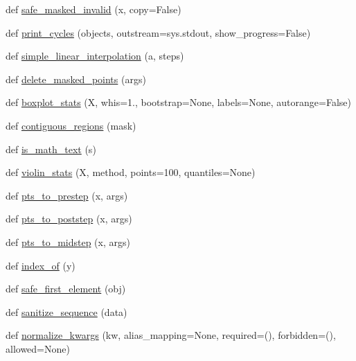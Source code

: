 \begin{DoxyCompactItemize}
\item 
def \hyperlink{namespacematplotlib_1_1cbook_a1b513669a33f2fff0c61d719ea76f0a1}{safe\+\_\+masked\+\_\+invalid} (x, copy=False)
\item 
def \hyperlink{namespacematplotlib_1_1cbook_ad14ca04fafb21b27932fe178ee5d32b6}{print\+\_\+cycles} (objects, outstream=sys.\+stdout, show\+\_\+progress=False)
\item 
def \hyperlink{namespacematplotlib_1_1cbook_a10de3acab7db43705a4a1a2ce7b12098}{simple\+\_\+linear\+\_\+interpolation} (a, steps)
\item 
def \hyperlink{namespacematplotlib_1_1cbook_aaef0de8c17f94f25ceba253a5abbc33e}{delete\+\_\+masked\+\_\+points} (args)
\item 
def \hyperlink{namespacematplotlib_1_1cbook_a09feb80736ebe2521845f87e1941bc14}{boxplot\+\_\+stats} (X, whis=1., bootstrap=None, labels=None, autorange=False)
\item 
def \hyperlink{namespacematplotlib_1_1cbook_aee5e1f5850d10d2ac4ce893123eadf2d}{contiguous\+\_\+regions} (mask)
\item 
def \hyperlink{namespacematplotlib_1_1cbook_af441c24cff462a6cd0aacd90ff7c7110}{is\+\_\+math\+\_\+text} (s)
\item 
def \hyperlink{namespacematplotlib_1_1cbook_acb8ae01168625dcd6f0dbcd72fd78176}{violin\+\_\+stats} (X, method, points=100, quantiles=None)
\item 
def \hyperlink{namespacematplotlib_1_1cbook_adb99f63714944cfeaad9052297db34d1}{pts\+\_\+to\+\_\+prestep} (x, args)
\item 
def \hyperlink{namespacematplotlib_1_1cbook_a72e84fb424d53d1657c70a6916a06ce4}{pts\+\_\+to\+\_\+poststep} (x, args)
\item 
def \hyperlink{namespacematplotlib_1_1cbook_abf6af67829ca61096a331b8f8294e729}{pts\+\_\+to\+\_\+midstep} (x, args)
\item 
def \hyperlink{namespacematplotlib_1_1cbook_a7ae5af68c98ed9f012d32478c0666b41}{index\+\_\+of} (y)
\item 
def \hyperlink{namespacematplotlib_1_1cbook_a6a6f0c198d6daf339623a024c000ced9}{safe\+\_\+first\+\_\+element} (obj)
\item 
def \hyperlink{namespacematplotlib_1_1cbook_a49db6f38fc64b1429d004a19c44d5582}{sanitize\+\_\+sequence} (data)
\item 
def \hyperlink{namespacematplotlib_1_1cbook_a144ca6cd74e33dfa5f931e3330047cad}{normalize\+\_\+kwargs} (kw, alias\+\_\+mapping=None, required=(), forbidden=(), allowed=None)
\end{DoxyCompactItemize}
